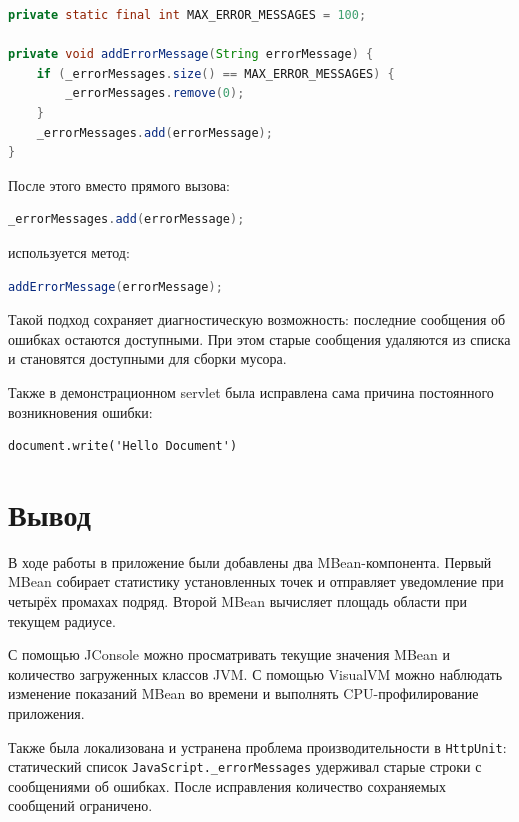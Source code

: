 \documentclass[a4paper,11pt]{article}
\begin{document}
\begin{lstlisting}[language=Java]
private static final int MAX_ERROR_MESSAGES = 100;

private void addErrorMessage(String errorMessage) {
    if (_errorMessages.size() == MAX_ERROR_MESSAGES) {
        _errorMessages.remove(0);
    }
    _errorMessages.add(errorMessage);
}
\end{lstlisting}

После этого вместо прямого вызова:

\begin{lstlisting}[language=Java]
_errorMessages.add(errorMessage);
\end{lstlisting}

используется метод:

\begin{lstlisting}[language=Java]
addErrorMessage(errorMessage);
\end{lstlisting}

Такой подход сохраняет диагностическую возможность: последние сообщения об ошибках остаются доступными. При этом старые сообщения удаляются из списка и становятся доступными для сборки мусора.

Также в демонстрационном servlet была исправлена сама причина постоянного возникновения ошибки:

\begin{lstlisting}
document.write('Hello Document')
\end{lstlisting}



\section{Вывод}

В ходе работы в приложение были добавлены два MBean-компонента. Первый MBean собирает статистику установленных точек и отправляет уведомление при четырёх промахах подряд. Второй MBean вычисляет площадь области при текущем радиусе.

С помощью JConsole можно просматривать текущие значения MBean и количество загруженных классов JVM. С помощью VisualVM можно наблюдать изменение показаний MBean во времени и выполнять CPU-профилирование приложения.

Также была локализована и устранена проблема производительности в \texttt{HttpUnit}: статический список \texttt{JavaScript.\_errorMessages} удерживал старые строки с сообщениями об ошибках. После исправления количество сохраняемых сообщений ограничено.
\end{document}
